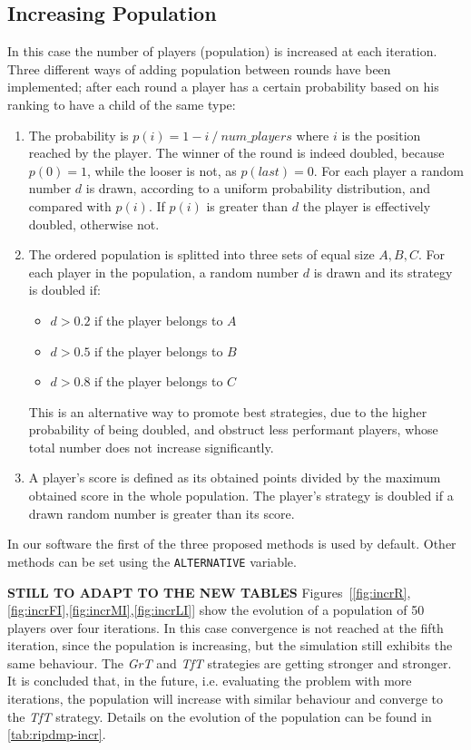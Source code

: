 \documentclass[journal,10pt,twoside]{IEEEtran}
\begin{document}
\subsection{Increasing Population}
In this case the number of players (population) is increased at each iteration. Three different ways of adding population between rounds have been implemented; after each round a player has a certain probability based on his ranking to have a child of the same type:
\begin{enumerate}
    \item The probability is $p(i)=1- i\ /\ num\_players$ where $i$ is the position reached by the player. The winner of the round is indeed doubled, because $p(0)=1$, while the looser is not, as $p(last)=0$.
    For each player a random number $d$ is drawn, according to a uniform probability distribution, and compared with $p(i)$. If $p(i)$ is greater than $d$ the player is effectively doubled, otherwise not.
    \item The ordered population is splitted into three sets of equal size $A,B,C$. For each player in the population, a random number $d$ is drawn and its strategy is doubled if:
    \begin{itemize}
        \item $d>0.2$ if the player belongs to $A$
        \item $d>0.5$ if the player belongs to $B$
        \item $d>0.8$ if the player belongs to $C$
    \end{itemize}
    This is an alternative way to promote best strategies, due to the higher probability of being doubled, and obstruct less performant players, whose total number does not increase significantly.
    \item A player's score is defined as its obtained points divided by the maximum obtained score in the whole population. The player's strategy is doubled if a drawn random number is greater than its score.
\end{enumerate}

In our software the first of the three proposed methods is used by default. Other methods can be set using the \texttt{ALTERNATIVE} variable.

\textbf{STILL TO ADAPT TO THE NEW TABLES}
Figures~[\ref{fig:incrR},\ref{fig:incrFI},\ref{fig:incrMI},\ref{fig:incrLI}] show the evolution of a population of 50 players over four iterations. In this case convergence is not reached at the fifth iteration, since the population is increasing, but the simulation still exhibits the same behaviour. The \textit{GrT} and \textit{TfT} strategies are getting stronger and stronger. It is concluded that, in the future, i.e. evaluating the problem with more iterations, the population will increase with similar behaviour and converge to the \textit{TfT} strategy. Details on the evolution of the population can be found in \autoref{tab:ripdmp-incr}.
\end{document}
